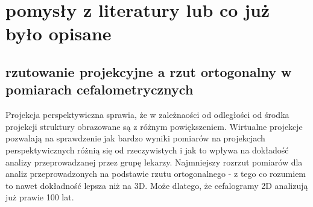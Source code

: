 \documentclass[11pt,a4paper]{article}
\begin{document}
\section{ pomysły z literatury lub co już było opisane}
\subsection{ rzutowanie projekcyjne a rzut ortogonalny w pomiarach cefalometrycznych}
Projekcja perspektywiczna sprawia, że w zależnaości od odległości od środka projekcji struktury obrazowane są z różnym powiększeniem.
Wirtualne projekcje pozwalają na sprawdzenie jak bardzo wyniki pomiarów na projekcjach perspektywicznych różnią się od rzeczywistych i jak to wpływa na dokładość analizy przeprowadzanej przez grupę lekarzy.
Najmniejszy rozrzut pomiarów \cite {diagnostics11122292}  dla analiz przeprowadzonych na podstawie rzutu ortogonalnego - z tego co rozumiem to nawet dokładność lepsza niż na 3D. Może dlatego, że cefalogramy 2D analizują już prawie 100 lat.


%
%
\printbibliography[title={Literatura}] %
\end{document}
